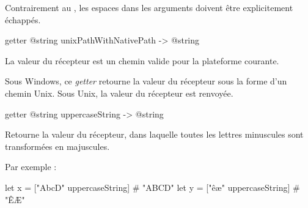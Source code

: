 Contrairement au , les espaces dans les arguments doivent être explicitement échappés.





\begin{galgas3box}
getter @string unixPathWithNativePath -> @string
\end{galgas3box}

La valeur du récepteur est un chemin valide pour la plateforme courante.

Sous Windows, ce \emph{getter} retourne la valeur du récepteur sous la forme d'un chemin Unix. Sous Unix, la valeur du récepteur est renvoyée.














\begin{galgas3box}
getter @string uppercaseString -> @string
\end{galgas3box}

Retourne la valeur du récepteur, dans laquelle toutes les lettres minuscules sont transformées en majuscules.

Par exemple :
\begin{galgas3}
let x = ["AbcD" uppercaseString] # "ABCD"
let y = ["êæ" uppercaseString] # "ÊÆ"
\end{galgas3}














%
















